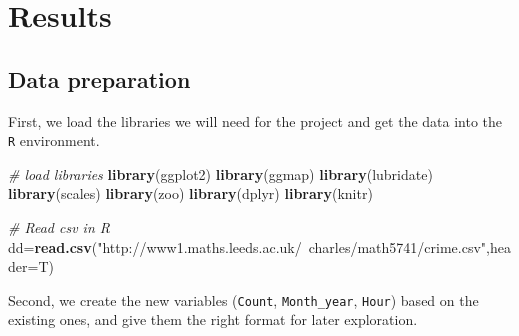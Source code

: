 \documentclass[]{article}
\newenvironment{Shaded}{\begin{snugshade}}{\end{snugshade}}
\newcommand{\KeywordTok}[1]{\textcolor[rgb]{0.13,0.29,0.53}{\textbf{{#1}}}}
\newcommand{\DataTypeTok}[1]{\textcolor[rgb]{0.13,0.29,0.53}{{#1}}}
\newcommand{\DecValTok}[1]{\textcolor[rgb]{0.00,0.00,0.81}{{#1}}}
\newcommand{\StringTok}[1]{\textcolor[rgb]{0.31,0.60,0.02}{{#1}}}
\newcommand{\CommentTok}[1]{\textcolor[rgb]{0.56,0.35,0.01}{\textit{{#1}}}}
\newcommand{\NormalTok}[1]{{#1}}
\begin{document}
\section{Results}\label{results}

\subsection{Data preparation}\label{data-preparation}

First, we load the libraries we will need for the project and get the
data into the \texttt{R} environment.

\begin{Shaded}
\begin{Highlighting}[]
\CommentTok{# load libraries}
\KeywordTok{library}\NormalTok{(ggplot2)}
\KeywordTok{library}\NormalTok{(ggmap)}
\KeywordTok{library}\NormalTok{(lubridate)}
\KeywordTok{library}\NormalTok{(scales)}
\KeywordTok{library}\NormalTok{(zoo)}
\KeywordTok{library}\NormalTok{(dplyr)}
\KeywordTok{library}\NormalTok{(knitr)}
\end{Highlighting}
\end{Shaded}

\begin{Shaded}
\begin{Highlighting}[]
\CommentTok{# Read csv in R}
\NormalTok{dd=}\KeywordTok{read.csv}\NormalTok{(}\StringTok{"http://www1.maths.leeds.ac.uk/~charles/math5741/crime.csv"}\NormalTok{,}\DataTypeTok{header=}\NormalTok{T)}
\end{Highlighting}
\end{Shaded}

Second, we create the new variables (\texttt{Count},
\texttt{Month\_year}, \texttt{Hour}) based on the existing ones, and
give them the right format for later exploration.

\begin{Shaded}
\end{Shaded}
\end{document}
